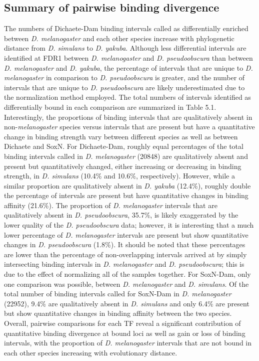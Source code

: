 \subsection{Summary of pairwise binding divergence}
The numbers of Dichaete-Dam binding intervals called as differentially enriched between \emph{D. melanogaster} and each other species increase with phylogenetic distance from \emph{D. simulans} to \emph{D. yakuba}. Although less differential intervals are identified at FDR1 between \emph{D. melanogaster} and \emph{D. pseudoobscura} than between \emph{D. melanogaster} and \emph{D. yakuba}, the percentage of intervals that are unique to \emph{D. melanogaster} in comparison to \emph{D. pseudoobscura} is greater, and the number of intervals that are unique to \emph{D. pseudoobscura} are likely underestimated due to the normalization method employed. The total numbers of intervals identified as differentially bound in each comparison are summarized in Table 5.1. Interestingly, the proportions of binding intervals that are qualitatively absent in non-\emph{melanogaster} species versus intervals that are present but have a quantitative change in binding strength vary between different species as well as between Dichaete and SoxN. For Dichaete-Dam, roughly equal percentages of the total binding intervals called in \emph{D. melanogaster} (20848) are qualitatively absent and present but quantitatively changed, either increasing or decreasing in binding strength, in \emph{D. simulans} (10.4\% and 10.6\%, respectively). However, while a similar proportion are qualitatively absent in \emph{D. yakuba} (12.4\%), roughly double the percentage of intervals are present but have quantitative changes in binding affinity (21.6\%). The proportion of \emph{D. melanogaster} intervals that are qualitatively absent in \emph{D. pseudoobscura}, 35.7\%, is likely exaggerated by the lower quality of the \emph{D. pseudoobscura} data; however, it is interesting that a much lower percentage of \emph{D. melanogaster} intervals are present but show quantitative changes in \emph{D. pseudoobscura} (1.8\%). It should be noted that these percentages are lower than the percentage of non-overlapping intervals arrived at by simply intersecting binding intervals in \emph{D. melanogaster} and \emph{D. pseudoobscura}; this is due to the effect of normalizing all of the samples together. For SoxN-Dam, only one comparison was possible, between \emph{D. melanogaster} and \emph{D. simulans}. Of the total number of binding intervals called for SoxN-Dam in \emph{D. melanogaster} (22952), 9.4\% are qualitatively absent in \emph{D. simulans} and only 6.4\% are present but show quantitative changes in binding affinity between the two species. Overall, pairwise comparisons for each TF reveal a significant contribution of quantitative binding divergence at bound loci as well as gain or loss of binding intervals, with the proportion of \emph{D. melanogaster} intervals that are not bound in each other species increasing with evolutionary distance.\\

